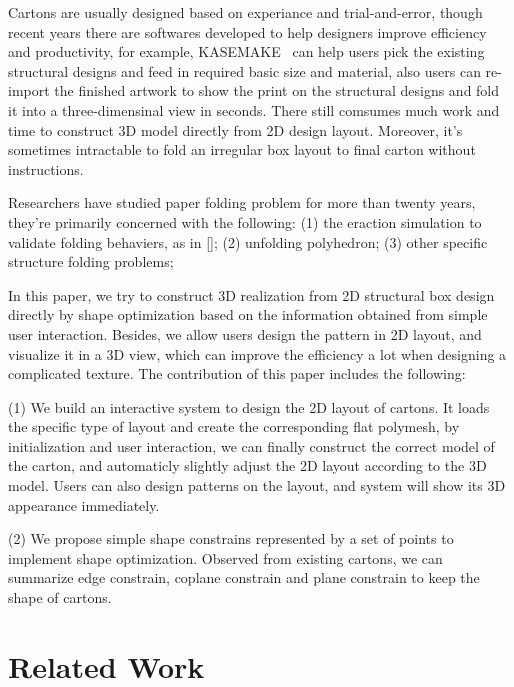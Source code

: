 \documentclass[submission]{gmp2018}
\begin{document}
Cartons are usually designed based on experiance and trial-and-error, though recent years there are softwares developed to help designers improve efficiency and productivity, for example, KASEMAKE~\cite{KASEMAKE} can help users pick the existing structural designs and feed in required basic size and material, also users can re-import the finished artwork to show the print on the structural designs and fold it into a three-dimensinal view in seconds. There still comsumes much work and time to construct 3D model directly from 2D design layout. Moreover, it's sometimes intractable to fold an irregular box layout to final carton without instructions.

{\color{red}{Briefly introduction to related works and their drawbacks.} }Researchers have studied paper folding problem for more than twenty years, they're primarily concerned with the following: (1) the eraction simulation to validate folding behaviers, as in []; (2) unfolding polyhedron; (3) other specific structure folding problems; 

In this paper, we try to construct 3D realization from 2D structural box design directly by shape optimization based on the information obtained from simple user interaction.  Besides, we allow users design the pattern in 2D layout, and visualize it in a 3D view, which can improve the efficiency a lot when designing a complicated texture. The contribution of this paper includes the following:

(1) We build an interactive system to design the 2D layout of cartons. It loads the specific type of layout and create the corresponding flat polymesh, by initialization and user interaction, we can finally construct the correct model of the carton, and automaticly slightly adjust the 2D layout according to the 3D model. Users can also design patterns on the layout, and system will show its 3D appearance immediately.

(2) We propose simple shape constrains represented by a set of points to implement shape optimization. Observed from existing cartons, we can summarize edge constrain, coplane constrain and plane constrain to keep the shape of cartons.

\section{Related Work}\label{sec:relatedwork}
\end{document}

